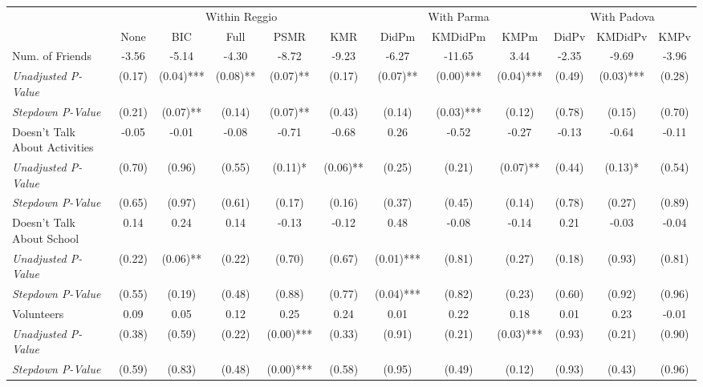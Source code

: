 \begin{tabular}{l c c c c c c c c c c c}
\toprule
& \multicolumn{5}{c}{Within Reggio} & \multicolumn{3}{c}{With Parma} & \multicolumn{3}{c}{With Padova} \\\cmidrule(lr){2-6} \cmidrule(lr){7-9} \cmidrule(lr){10-12}
 & None & BIC & Full & PSMR & KMR & DidPm & KMDidPm & KMPm & DidPv & KMDidPv & KMPv \\
\midrule
Num. of Friends & -3.56 & -5.14 & -4.30 & -8.72 & -9.23 & -6.27 & -11.65 & 3.44 & -2.35 & -9.69 & -3.96 \\
\quad \textit{Unadjusted P-Value} & (0.17) & (0.04)*** & (0.08)** & (0.07)** & (0.17) & (0.07)** & (0.00)*** & (0.04)*** & (0.49) & (0.03)*** & (0.28) \\
\quad \textit{Stepdown P-Value} & (0.21) & (0.07)** & (0.14) & (0.07)** & (0.43) & (0.14) & (0.03)*** & (0.12) & (0.78) & (0.15) & (0.70) \\
Doesn't Talk About Activities & -0.05 & -0.01 & -0.08 & -0.71 & -0.68 & 0.26 & -0.52 & -0.27 & -0.13 & -0.64 & -0.11 \\
\quad \textit{Unadjusted P-Value} & (0.70) & (0.96) & (0.55) & (0.11)* & (0.06)** & (0.25) & (0.21) & (0.07)** & (0.44) & (0.13)* & (0.54) \\
\quad \textit{Stepdown P-Value} & (0.65) & (0.97) & (0.61) & (0.17) & (0.16) & (0.37) & (0.45) & (0.14) & (0.78) & (0.27) & (0.89) \\
Doesn't Talk About School & 0.14 & 0.24 & 0.14 & -0.13 & -0.12 & 0.48 & -0.08 & -0.14 & 0.21 & -0.03 & -0.04 \\
\quad \textit{Unadjusted P-Value} & (0.22) & (0.06)** & (0.22) & (0.70) & (0.67) & (0.01)*** & (0.81) & (0.27) & (0.18) & (0.93) & (0.81) \\
\quad \textit{Stepdown P-Value} & (0.55) & (0.19) & (0.48) & (0.88) & (0.77) & (0.04)*** & (0.82) & (0.23) & (0.60) & (0.92) & (0.96) \\
Volunteers & 0.09 & 0.05 & 0.12 & 0.25 & 0.24 & 0.01 & 0.22 & 0.18 & 0.01 & 0.23 & -0.01 \\
\quad \textit{Unadjusted P-Value} & (0.38) & (0.59) & (0.22) & (0.00)*** & (0.33) & (0.91) & (0.21) & (0.03)*** & (0.93) & (0.21) & (0.90) \\
\quad \textit{Stepdown P-Value} & (0.59) & (0.83) & (0.48) & (0.00)*** & (0.58) & (0.95) & (0.49) & (0.12) & (0.93) & (0.43) & (0.96) \\
\bottomrule
\end{tabular}
